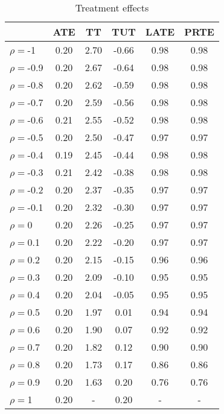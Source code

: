 \begin{table}[htb]
\centering
\caption{Treatment effects}
\label{table:te}
\begin{tabular}{lccccc}
\hline
 & ATE & TT & TUT & LATE & PRTE \\
\hline\hline
$\rho=$-1 & 0.20 & 2.70 & -0.66 & 0.98 & 0.98 \\
$\rho=$-0.9 & 0.20 & 2.67 & -0.64 & 0.98 & 0.98 \\
$\rho=$-0.8 & 0.20 & 2.62 & -0.59 & 0.98 & 0.98 \\
$\rho=$-0.7 & 0.20 & 2.59 & -0.56 & 0.98 & 0.98 \\
$\rho=$-0.6 & 0.21 & 2.55 & -0.52 & 0.98 & 0.98 \\
$\rho=$-0.5 & 0.20 & 2.50 & -0.47 & 0.97 & 0.97 \\
$\rho=$-0.4 & 0.19 & 2.45 & -0.44 & 0.98 & 0.98 \\
$\rho=$-0.3 & 0.21 & 2.42 & -0.38 & 0.98 & 0.98 \\
$\rho=$-0.2 & 0.20 & 2.37 & -0.35 & 0.97 & 0.97 \\
$\rho=$-0.1 & 0.20 & 2.32 & -0.30 & 0.97 & 0.97 \\
$\rho=$0 & 0.20 & 2.26 & -0.25 & 0.97 & 0.97 \\
$\rho=$0.1 & 0.20 & 2.22 & -0.20 & 0.97 & 0.97 \\
$\rho=$0.2 & 0.20 & 2.15 & -0.15 & 0.96 & 0.96 \\
$\rho=$0.3 & 0.20 & 2.09 & -0.10 & 0.95 & 0.95 \\
$\rho=$0.4 & 0.20 & 2.04 & -0.05 & 0.95 & 0.95 \\
$\rho=$0.5 & 0.20 & 1.97 & 0.01 & 0.94 & 0.94 \\
$\rho=$0.6 & 0.20 & 1.90 & 0.07 & 0.92 & 0.92 \\
$\rho=$0.7 & 0.20 & 1.82 & 0.12 & 0.90 & 0.90 \\
$\rho=$0.8 & 0.20 & 1.73 & 0.17 & 0.86 & 0.86 \\
$\rho=$0.9 & 0.20 & 1.63 & 0.20 & 0.76 & 0.76 \\
$\rho=$1 & 0.20 & - & 0.20 & - & - \\
\hline
\end{tabular}
\end{table}
